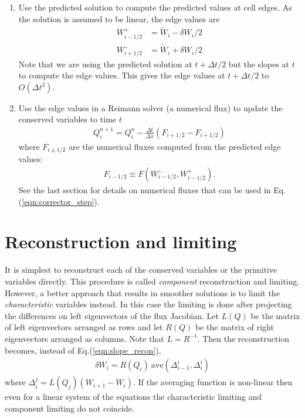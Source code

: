 \documentclass[11pt, reqno]{amsart}
\newcommand{\eqr}[1]{Eq.\thinspace(#1)}
\theoremstyle{definition}
\begin{document}
\begin{enumerate}
\item Use the predicted solution to compute the predicted values at
  cell edges. As the solution is assumed to be linear, the edge values
  are
  \begin{align}
    W_{i-1/2}^+ &= \tilde{W}_i - \delta W_i/2 \\
    W_{i+1/2}^- &= \tilde{W}_i + \delta W_i/2
  \end{align}
  Note that we are using the predicted solution at $t+\Delta t/2$ but
  the slopes at $t$ to compute the edge values. This gives the edge
  values at $t+\Delta t/2$ to $O(\Delta t^2)$.

\item Use the edge values in a Reimann solver (a numerical flux) to
  update the conserved variables to time $t$
  \begin{align}
    Q^{n+1}_i = Q_i^n - \frac{\Delta t}{\Delta x}(F_{i+1/2}-F_{i+1/2}) \label{eqn:corrector_step}
  \end{align}
  where $F_{i\pm 1/2}$ are the numerical fluxes computed from the
  predicted edge values:
  \begin{align}
    F_{i-1/2} \equiv F(W_{i-1/2}^-, W_{i-1/2}^+).
  \end{align}
  See the last section for details on numerical fluxes that can be
  used in \eqr{\ref{eqn:corrector_step}}.

\end{enumerate}

\section{Reconstruction and limiting}

It is simplest to reconstruct each of the conserved variables or the
primitive variables directly. This procedure is called
\emph{component} reconstruction and limiting. However, a better
approach that results in smoother solutions is to limit the
\emph{characteristic} variables instead. In this case the limiting is
done after projecting the differences on left eigenvectors of the flux
Jacobian. Let $L(Q)$ be the matrix of left eigenvectors arranged as
rows and let $R(Q)$ be the matrix of right eigenvectors arranged as
columns. Note that $L=R^{-1}$. Then the reconstruction becomes,
instead of \eqr{\ref{eqn:slope_recon}},
\begin{align}
  \delta W_i = R(Q_i)\ \mathrm{ave}(\Delta^i_{i-1}, \Delta^i_i)
\end{align}
where $\Delta^j_i = L(Q_j)(W_{i+1}-W_i)$. If the averaging function is
non-linear then even for a linear system of the equations the
characteristic limiting and component limiting do not coincide.
\end{document}
